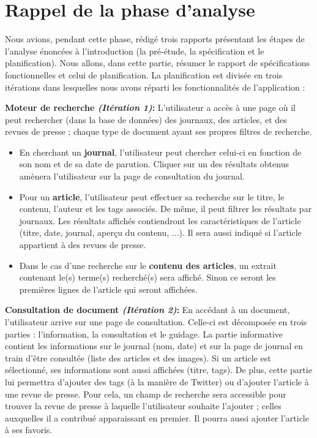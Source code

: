 \section{Rappel de la phase d'analyse}
\label{sec:rappel}

	Nous avions, pendant cette phase, rédigé trois rapports présentant les étapes de l'analyse énoncées à l'introduction (la pré-étude\cite{Pretude}, la spécification\cite{Specs} et le planification\cite{Planif}). Nous allons, dans cette partie, résumer le rapport de spécifications fonctionnelles et celui de planification. La planification est divisée en trois itérations dans lesquelles nous avons réparti les fonctionnalités de l'application : 

	\textbf{Moteur de recherche \textit{(Itération 1)}:} L'utilisateur a accès à une page où il peut rechercher (dans la base de données) des journaux, des articles, et des revues de presse ; chaque type de document ayant ses propres filtres de recherche.
	
	\begin{itemize}
	\item En cherchant un \textbf{journal}, l'utilisateur peut chercher celui-ci en fonction de son nom et de sa date de parution. Cliquer sur un des résultats obtenus amènera l'utilisateur sur la page de consultation du journal. 
	\item Pour un \textbf{article}, l'utilisateur peut effectuer sa recherche sur le titre, le contenu, l'auteur et les tags associés. De même, il peut filtrer les résultats par journaux. Les résultats affichés contiendront les caractéristiques de l'article (titre, date, journal, aperçu du contenu, ...). Il sera aussi indiqué si l'article appartient à des revues de presse. 
	\item Dans le cas d'une recherche sur le \textbf{contenu des articles}, un extrait contenant le(s) terme(s) recherché(s) sera affiché. Sinon ce seront les premières lignes de l'article qui seront affichées. 
\end{itemize}

	\textbf{Consultation de document \textit{(Itération 2)}:} En accédant à  un document, l'utilisateur arrive sur une page de consultation. Celle-ci est décomposée en trois parties : l'information, la consultation et le guidage. La partie informative contient les informations sur le journal (nom, date) et sur la page de journal en train d'être consultée (liste des articles et des images). Si un article est sélectionné, ses informations sont aussi affichées (titre, tags). De plus, cette partie lui permettra d'ajouter des tags (à la manière de Twitter) ou d'ajouter l'article à une revue de presse. Pour cela, un champ de recherche sera accessible pour trouver la revue de presse à laquelle l'utilisateur souhaite l'ajouter ; celles auxquelles il a contribué apparaissant en premier. Il pourra aussi ajouter l'article à ses favoris. 

